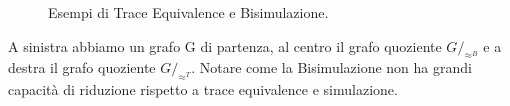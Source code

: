 \begin{example}
\begin{figure}[H]
{
}
\caption{Esempi di Trace Equivalence e Bisimulazione.\label{fig:bisim}}
\end{figure}
\end{example}
A sinistra abbiamo un grafo G di partenza, al centro il grafo quoziente $G/_{\approx^B}$ e a destra il grafo quoziente $G/_{\approx^T}$. Notare come la Bisimulazione non ha grandi capacità di riduzione rispetto a trace equivalence e simulazione.

